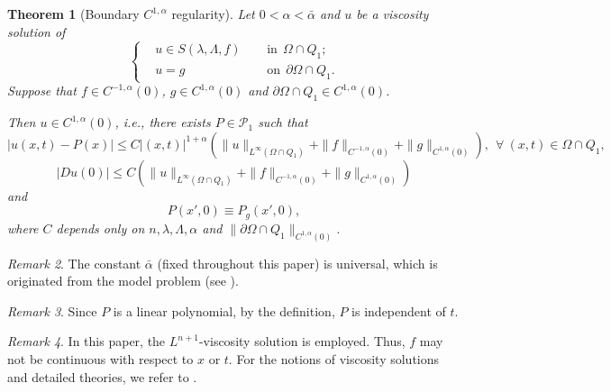 \documentclass[preprint,12pt]{elsarticle}
\newtheorem{theorem}{Theorem}[section]
\theoremstyle{definition}
\theoremstyle{remark}
\newtheorem{remark}[theorem]{Remark}
\numberwithin{equation}{section}
\begin{document}
\begin{theorem}[Boundary $C^{1,\alpha}$ regularity]\label{C1a}
  Let $0<\alpha<\bar\alpha$ and $u$ be a viscosity solution of
  \begin{equation*}
\left\{\begin{aligned}
&u\in S(\lambda,\Lambda,f)&& ~~\mbox{in}~~\Omega\cap Q_1;\\
&u=g&& ~~\mbox{on}~~\partial \Omega\cap Q_1.
\end{aligned}\right.
\end{equation*}
Suppose that $f\in C^{-1,\alpha}(0)$, $g\in C^{1,\alpha}(0)$ and $\partial \Omega \cap Q_1 \in C^{1,\alpha}(0)$.

Then $u\in C^{1,\alpha}(0)$, i.e., there exists $P\in \mathcal{P}_1$ such that
\begin{equation}\label{e.C1a}
|u(x,t)-P(x)|\leq C|(x,t)|^{1+\alpha}\left(\|u\|_{L^{\infty}(\Omega\cap Q_1)}+
\|f\|_{C^{-1,\alpha}(0)}+\|g\|_{C^{1,\alpha}(0)}\right),~~\forall~(x,t)\in \Omega \cap Q_{1},
\end{equation}
\begin{equation*}
  |Du(0)|\leq C\left(\|u\|_{L^{\infty}(\Omega\cap Q_1)}+
\|f\|_{C^{-1,\alpha}(0)}+\|g\|_{C^{1,\alpha}(0)}\right)
\end{equation*}
and
\begin{equation}\label{e1.7}
P(x',0)\equiv P_g(x',0),
\end{equation}
where $C$ depends only on $n, \lambda,\Lambda, \alpha$ and $\|\partial \Omega\cap Q_1\|_{C^{1,\alpha}(0)}$.
\end{theorem}

\begin{remark}\label{re1.1-ref3}
The constant $\bar\alpha$ (fixed throughout this paper) is universal, which is originated from the model problem (see ).
\end{remark}

\begin{remark}\label{re1.3}
Since $P$ is a linear polynomial, by the definition, $P$ is independent of $t$.
\end{remark}

\begin{remark}\label{re1.1-ref}
In this paper, the $L^{n+1}$-viscosity solution is employed. Thus, $f$ may not be continuous with respect to $x$ or $t$. For the notions of viscosity solutions and detailed theories, we refer to \cite{MR1351007,MR1789919,MR1118699,MR1135923}.
\end{remark}
\end{document}
